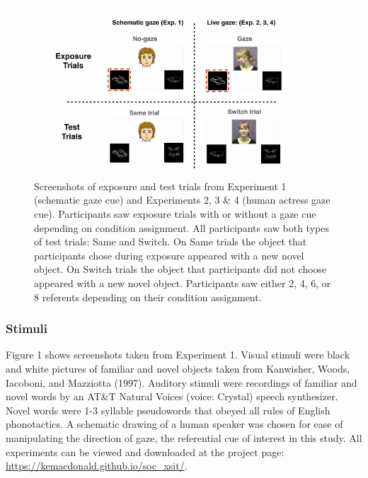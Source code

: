 \documentclass[authoryear, review]{elsarticle}
\newenvironment{CodeChunk}{}{}
\begin{document}
\begin{CodeChunk}
\begin{figure}[tb]

{\centering \includegraphics[width=1\linewidth]{figs/stimuli-1} 

}

\caption[Screenshots of exposure and test trials from Experiment 1 (schematic gaze cue) and Experiments 2, 3 \& 4 (human actress gaze cue)]{Screenshots of exposure and test trials from Experiment 1 (schematic gaze cue) and Experiments 2, 3 \& 4 (human actress gaze cue). Participants saw exposure trials with or without a gaze cue depending on condition assignment. All participants saw both types of test trials: Same and Switch. On Same trials the object that participants chose during exposure appeared with a new novel object. On Switch trials the object that participants did not choose appeared with a new novel object. Participants saw either 2, 4, 6, or 8 referents depending on their condition assignment.}\label{fig:stimuli}
\end{figure}
\end{CodeChunk}

\subsubsection{Stimuli}\label{stimuli}

Figure 1 shows screenshots taken from Experiment 1. Visual stimuli were
black and white pictures of familiar and novel objects taken from
Kanwisher, Woods, Iacoboni, and Mazziotta (1997). Auditory stimuli were
recordings of familiar and novel words by an AT\&T Natural Voices
\texttrademark (voice: Crystal) speech synthesizer. Novel words were 1-3
syllable pseudowords that obeyed all rules of English phonotactics. A
schematic drawing of a human speaker was chosen for ease of manipulating
the direction of gaze, the referential cue of interest in this study.
All experiments can be viewed and downloaded at the project page:
\url{https://kemacdonald.github.io/soc_xsit/}.
\end{document}
